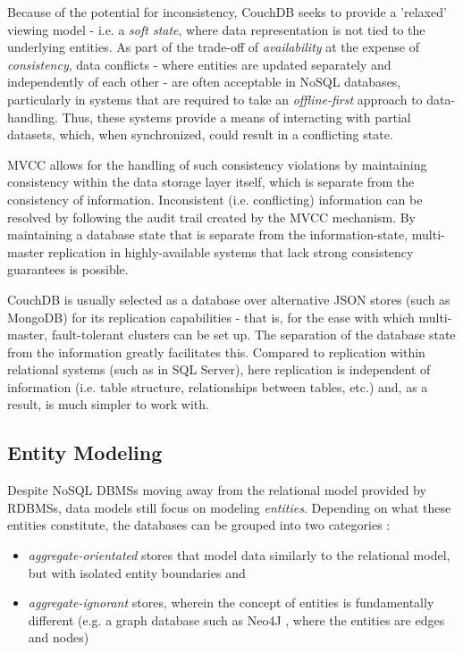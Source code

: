 Because of the potential for inconsistency, CouchDB seeks to provide a 'relaxed' viewing model - i.e. a \textit{soft state}, where data representation is not tied to the underlying entities. As part of the trade-off of \textit{availability} at the expense of \textit{consistency}, data conflicts - where entities are updated separately and independently of each other - are often acceptable in NoSQL databases, particularly in systems that are required to take an \textit{offline-first} approach to data-handling. Thus, these systems provide a means of interacting with partial datasets, which, when synchronized, could result in a conflicting state.

MVCC allows for the handling of such consistency violations by maintaining consistency within the data storage layer itself, which is separate from the consistency of information. Inconsistent (i.e. conflicting) information can be resolved by following the audit trail created by the MVCC mechanism. By maintaining a database state that is separate from the information-state, multi-master replication in highly-available systems that lack strong consistency guarantees is possible.

CouchDB is usually selected as a database over alternative JSON stores (such as MongoDB) for its replication capabilities - that is, for the ease with which multi-master, fault-tolerant clusters can be set up. The separation of the database state from the information greatly facilitates this. Compared to replication within relational systems (such as in SQL Server), here replication is independent of information (i.e. table structure, relationships between tables, etc.) and, as a result, is much simpler to work with.

\subsection{Entity Modeling}
Despite NoSQL DBMSs moving away from the relational model provided by RDBMSs, data models still focus on modeling \textit{entities}. Depending on what these entities constitute, the databases can be grouped into two categories \cite{fowlerAggregate}:

\begin{itemize}
    \item \textit{aggregate-orientated} stores that model data similarly to the relational model, but with isolated entity boundaries and
    \item \textit{aggregate-ignorant} stores, wherein the concept of entities is fundamentally different (e.g. a graph database such as Neo4J \cite{sadalage2012}, where the entities are edges and nodes)
\end{itemize}

